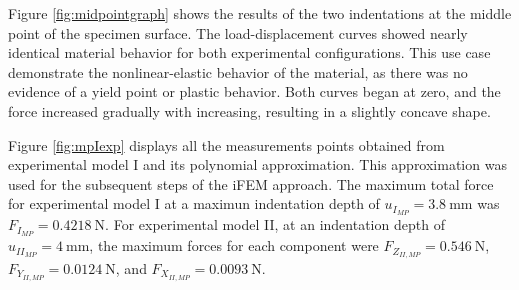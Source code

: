 Figure \ref{fig:midpointgraph} shows the results of the two indentations at the middle point 
 of the specimen surface.
The load-displacement curves showed nearly identical material behavior for both 
experimental configurations. This use case demonstrate the nonlinear-elastic behavior of the material, 
as there was no evidence of a yield point or plastic behavior. 
Both curves began at zero, and the force increased gradually with increasing,
resulting in a slightly concave shape. 

Figure \ref{fig:mpIexp} displays all the measurements points obtained from experimental model I and its 
polynomial approximation. This approximation was used for the subsequent steps of the iFEM approach. The 
maximum total force for experimental model I at a maximun indentation depth of 
$u_{I_{MP}} = \SI{3.8}{\milli \m}$ was $F_{I_{MP}} = \SI{0.4218}{\newton}$. For experimental 
model II, at an indentation depth of 
$u_{II_{MP}} = \SI{4}{\milli \m}$, the maximum forces for each component were
 $F_{Z_{II,MP}} = \SI{0.546}{\newton}$, $F_{Y_{II,MP}} = \SI{0.0124}{\newton}$, and $F_{X_{II,MP}} = \SI{0.0093}{\newton}$.\\

